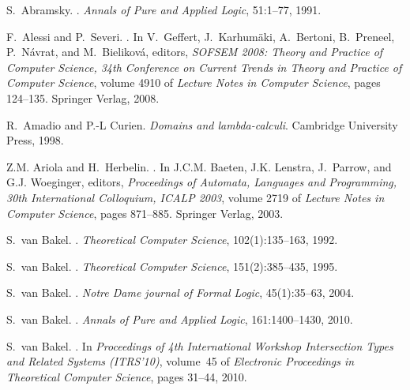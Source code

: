 \documentclass{CSML}
\begin{document}
 \begin{thebibliography}{10}

S.~Abramsky.
.
\newblock \emph{Annals of Pure and Applied Logic}, 51:1--77, 1991.

F.~Alessi and P.~Severi.
.
\newblock In V.~Geffert, J.~Karhum{\"a}ki, A.~Bertoni, B.~Preneel,
 P.~N{\'a}vrat, and M.~Bielikov{\'a}, editors, \emph{SOFSEM 2008: Theory and
 Practice of Computer Science, 34th Conference on Current Trends in Theory and
 Practice of Computer Science}, volume 4910 of \emph{Lecture Notes in Computer
 Science}, pages 124--135. Springer Verlag, 2008.

R.~Amadio and P.-L Curien.
\newblock \emph{{Domains and lambda-calculi}}.
\newblock Cambridge University Press, 1998.

Z.M. Ariola and H.~Herbelin.
.
\newblock In J.C.M. Baeten, J.K. Lenstra, J.~Parrow, and G.J. Woeginger,
 editors, \emph{Proceedings of Automata, Languages and Programming, 30th
 International Colloquium, ICALP 2003}, volume 2719 of \emph{Lecture Notes in
 Computer Science}, pages 871--885. Springer Verlag, 2003.

S.~van Bakel.
.
\newblock \emph{Theoretical Computer Science}, 102(1):135--163, 1992.

S.~van Bakel.
.
\newblock \emph{Theoretical Computer Science}, 151(2):385--435, 1995.

S.~van Bakel.
.
\newblock \emph{Notre Dame journal of Formal Logic}, 45(1):35--63, 2004.

S.~van Bakel.
.
\newblock \emph{Annals of Pure and Applied Logic}, 161:1400--1430, 2010.

S.~van Bakel.
.
\newblock In \emph{Proceedings of 4th International Workshop \emph{Intersection
 Types and Related Systems} (ITRS'10)}, volume~45 of \emph{Electronic
 Proceedings in Theoretical Computer Science}, pages 31--44, 2010.


\end{thebibliography}
\end{document}
